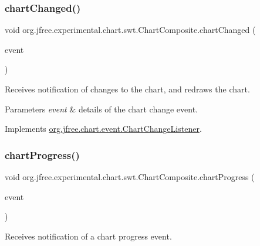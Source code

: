 \subsubsection{\texorpdfstring{chart\+Changed()}{chartChanged()}}
{\footnotesize\ttfamily void org.\+jfree.\+experimental.\+chart.\+swt.\+Chart\+Composite.\+chart\+Changed (\begin{DoxyParamCaption}\item[{\mbox{\hyperlink{classorg_1_1jfree_1_1chart_1_1event_1_1_chart_change_event}{Chart\+Change\+Event}}}]{event }\end{DoxyParamCaption})}

Receives notification of changes to the chart, and redraws the chart.


\begin{DoxyParams}{Parameters}
{\em event} & details of the chart change event. \\
\hline
\end{DoxyParams}


Implements \mbox{\hyperlink{interfaceorg_1_1jfree_1_1chart_1_1event_1_1_chart_change_listener_ac4ad92c4f9cc7be26964dab79d882bee}{org.\+jfree.\+chart.\+event.\+Chart\+Change\+Listener}}.

\mbox{\label{classorg_1_1jfree_1_1experimental_1_1chart_1_1swt_1_1_chart_composite_a1cb57ed2b46ce82a5da55e2d44ff6cdd}} 
\subsubsection{\texorpdfstring{chart\+Progress()}{chartProgress()}}
{\footnotesize\ttfamily void org.\+jfree.\+experimental.\+chart.\+swt.\+Chart\+Composite.\+chart\+Progress (\begin{DoxyParamCaption}\item[{\mbox{\hyperlink{classorg_1_1jfree_1_1chart_1_1event_1_1_chart_progress_event}{Chart\+Progress\+Event}}}]{event }\end{DoxyParamCaption})}

Receives notification of a chart progress event.


